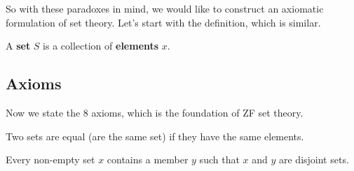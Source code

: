 \documentclass{article}
\begin{document}
  So with these paradoxes in mind, we would like to construct an axiomatic formulation of set theory. Let's start with the definition, which is similar. 

  \begin{definition}[Set]
    A \textbf{set} $S$ is a collection of \textbf{elements} $x$. 
  \end{definition} 

  \subsection{Axioms}

    Now we state the 8 axioms, which is the foundation of ZF set theory. 

    \begin{axiom}
      Two sets are equal (are the same set) if they have the same elements. 
    \end{axiom}

    \begin{axiom}
      Every non-empty set $x$ contains a member $y$ such that $x$ and $y$ are disjoint sets. 
    \end{axiom}

    \begin{axiom}
      
    \end{axiom} 

    \begin{axiom}
      
    \end{axiom}

    \begin{axiom}
      
    \end{axiom}

    \begin{axiom}
      
    \end{axiom} 

    \begin{axiom}
      
    \end{axiom}

    \begin{axiom}
      
    \end{axiom}
\end{document}
